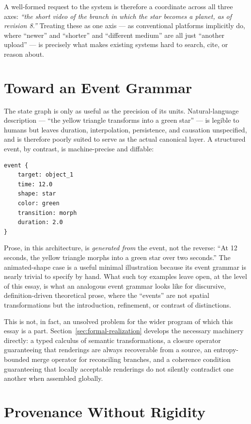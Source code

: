 \documentclass[11pt]{article}
\theoremstyle{definition}
\begin{document}
A well-formed request to the system is therefore a coordinate across all three axes: \emph{``the short video of the branch in which the star becomes a planet, as of revision 8.''} Treating these as one axis --- as conventional platforms implicitly do, where ``newer'' and ``shorter'' and ``different medium'' are all just ``another upload'' --- is precisely what makes existing systems hard to search, cite, or reason about.

\section{Toward an Event Grammar}
\label{sec:event-grammar}

The state graph is only as useful as the precision of its units. Natural-language description --- ``the yellow triangle transforms into a green star'' --- is legible to humans but leaves duration, interpolation, persistence, and causation unspecified, and is therefore poorly suited to serve as the actual canonical layer. A structured event, by contrast, is machine-precise and diffable:

\begin{verbatim}
event {
    target: object_1
    time: 12.0
    shape: star
    color: green
    transition: morph
    duration: 2.0
}
\end{verbatim}

Prose, in this architecture, is \emph{generated from} the event, not the reverse: ``At 12 seconds, the yellow triangle morphs into a green star over two seconds.'' The animated-shape case is a useful minimal illustration because its event grammar is nearly trivial to specify by hand. What such toy examples leave open, at the level of this essay, is what an analogous event grammar looks like for discursive, definition-driven theoretical prose, where the ``events'' are not spatial transformations but the introduction, refinement, or contrast of distinctions.

This is not, in fact, an unsolved problem for the wider program of which this essay is a part. Section~\ref{sec:formal-realization} develops the necessary machinery directly: a typed calculus of semantic transformations, a closure operator guaranteeing that renderings are always recoverable from a source, an entropy-bounded merge operator for reconciling branches, and a coherence condition guaranteeing that locally acceptable renderings do not silently contradict one another when assembled globally.

\section{Provenance Without Rigidity}
\label{sec:provenance-rigidity}
\end{document}
